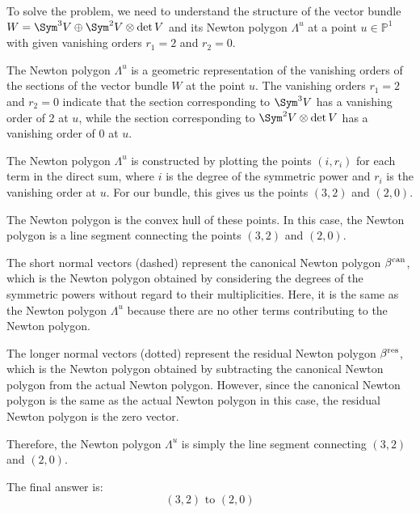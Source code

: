 To solve the problem, we need to understand the structure of the vector bundle \(W = \Sym^3 V \oplus \Sym^2 V \otimes \det V\) and its Newton polygon \(\Lambda^u\) at a point \(u \in \mathbb{P}^1\) with given vanishing orders \(r_1 = 2\) and \(r_2 = 0\).

The Newton polygon \(\Lambda^u\) is a geometric representation of the vanishing orders of the sections of the vector bundle \(W\) at the point \(u\). The vanishing orders \(r_1 = 2\) and \(r_2 = 0\) indicate that the section corresponding to \(\Sym^3 V\) has a vanishing order of 2 at \(u\), while the section corresponding to \(\Sym^2 V \otimes \det V\) has a vanishing order of 0 at \(u\).

The Newton polygon \(\Lambda^u\) is constructed by plotting the points \((i, r_i)\) for each term in the direct sum, where \(i\) is the degree of the symmetric power and \(r_i\) is the vanishing order at \(u\). For our bundle, this gives us the points \((3, 2)\) and \((2, 0)\).

The Newton polygon is the convex hull of these points. In this case, the Newton polygon is a line segment connecting the points \((3, 2)\) and \((2, 0)\).

The short normal vectors (dashed) represent the canonical Newton polygon \(\beta^{\rm can}\), which is the Newton polygon obtained by considering the degrees of the symmetric powers without regard to their multiplicities. Here, it is the same as the Newton polygon \(\Lambda^u\) because there are no other terms contributing to the Newton polygon.

The longer normal vectors (dotted) represent the residual Newton polygon \(\beta^{\rm res}\), which is the Newton polygon obtained by subtracting the canonical Newton polygon from the actual Newton polygon. However, since the canonical Newton polygon is the same as the actual Newton polygon in this case, the residual Newton polygon is the zero vector.

Therefore, the Newton polygon \(\Lambda^u\) is simply the line segment connecting \((3, 2)\) and \((2, 0)\).

The final answer is:
\[
\boxed{(3, 2) \text{ to } (2, 0)}
\]